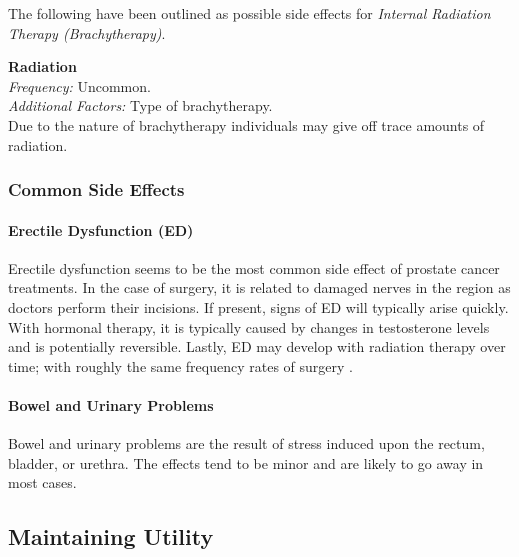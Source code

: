 \documentclass[journal]{vgtc}                %
\begin{document}
                        The following have been outlined as possible side effects for \textit{Internal Radiation Therapy (Brachytherapy)}.
                        \newline

                        \textbf{Radiation}
                        \\ \textit{Frequency:} Uncommon.
                        \\ \textit{Additional Factors:} Type of brachytherapy.
                        \\ Due to the nature of brachytherapy individuals may give off trace amounts of radiation. \cite{RadiationTherapy:2005}
                        \newline

                \subsubsection{Common Side Effects}
                        \paragraph{Erectile Dysfunction (ED)}
                                Erectile dysfunction seems to be the most common side effect of prostate cancer treatments.
                                In the case of surgery, it is related to damaged nerves in the region as doctors perform their incisions. If present, signs of ED will typically arise quickly.
                                With hormonal therapy, it is typically caused by changes in testosterone levels and is potentially reversible.
                                Lastly, ED may develop with radiation therapy over time; with roughly the same frequency rates of surgery \cite{RadiationTherapy:2005}.

                        \paragraph{Bowel and Urinary Problems}
                                Bowel and urinary problems are the result of stress induced upon the rectum, bladder, or urethra.
                                The effects tend to be minor and are likely to go away in most cases.


        \subsection{Maintaining Utility}
\end{document}
